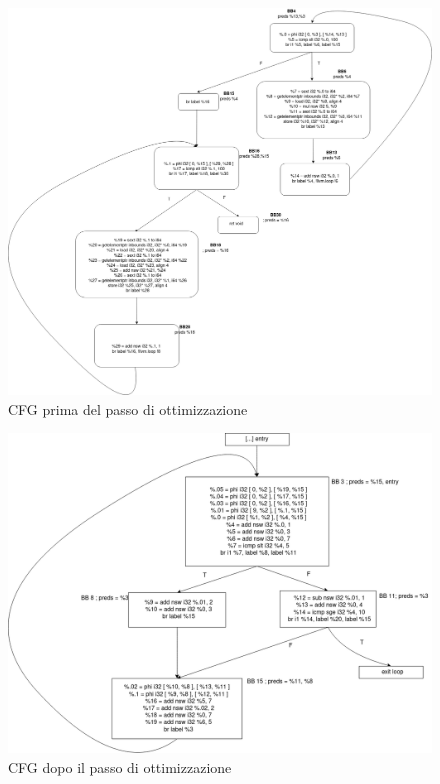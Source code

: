 \documentclass[letterpaper, 11pt]{article}
\begin{document}
\begin{figure}[H]
\centering
\includegraphics[width=20cm]{./bfore.png}
\caption{CFG prima del passo di ottimizzazione}
\end{figure}

\begin{figure}[H]
\centering
\includegraphics[width=20cm]{./after.png}
\caption{CFG dopo il passo di ottimizzazione}
\end{figure}

\newpage
\end{document}
